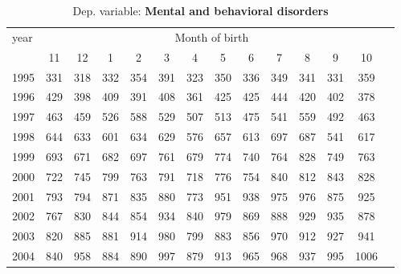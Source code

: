  \begin{table}[H] \begin{threeparttable} \centering \caption{Dep. variable: \textbf{Mental and behavioral disorders}} {\def\sym#1{\ifmmode^{#1}\else\(^{#1}\)\fi} \begin{tabular}{l*{13}{c}} \toprule year & \multicolumn{12}{c}{Month of birth} \\ \cmidrule(lr){2-13} 
            &          11&          12&           1&           2&           3&           4&           5&           6&           7&           8&           9&          10\\
1995        &         331&         318&         332&         354&         391&         323&         350&         336&         349&         341&         331&         359\\
1996        &         429&         398&         409&         391&         408&         361&         425&         425&         444&         420&         402&         378\\
1997        &         463&         459&         526&         588&         529&         507&         513&         475&         541&         559&         492&         463\\
1998        &         644&         633&         601&         634&         629&         576&         657&         613&         697&         687&         541&         617\\
1999        &         693&         671&         682&         697&         761&         679&         774&         740&         764&         828&         749&         763\\
2000        &         722&         745&         799&         763&         791&         718&         776&         754&         840&         812&         843&         828\\
2001        &         793&         794&         871&         835&         880&         773&         951&         938&         975&         976&         875&         925\\
2002        &         767&         830&         844&         854&         934&         840&         979&         869&         888&         929&         935&         878\\
2003        &         820&         885&         881&         914&         980&         799&         883&         856&         970&         912&         927&         941\\
2004        &         840&         958&         884&         890&         997&         879&         913&         965&         968&         937&         995&        1006\\

\end{tabular}}
\end{threeparttable}
\end{table}
